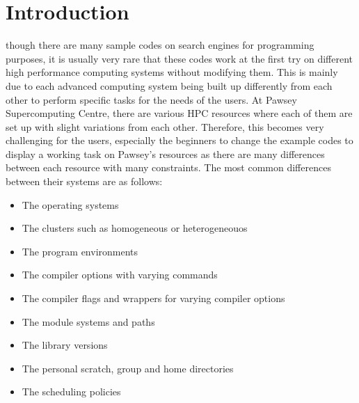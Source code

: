 
\section{Introduction}

 though there are many sample codes on search engines for programming purposes, it is usually very rare that these codes work at 
the first try on different high performance computing systems without modifying them. This is mainly due to each advanced computing system being built 
up differently from each other to perform specific tasks for the needs of the users. At Pawsey Supercomputing Centre, there are various HPC resources 
where each of them are set up with slight variations from each other. Therefore, this becomes very challenging for the users, especially the beginners 
to change the example codes to display a working task on Pawsey's resources as there are many differences between each resource with many constraints. 
The most common differences between their systems are as follows:

\begin{itemize}
\item The operating systems
\item The clusters such as homogeneous or heterogeneouos
\item The program environments
\item The compiler options with varying commands
\item The compiler flags and wrappers for varying compiler options
\item The module systems and paths 
\item The library versions
\item The personal scratch, group and home directories
\item The scheduling policies
\end{itemize}

